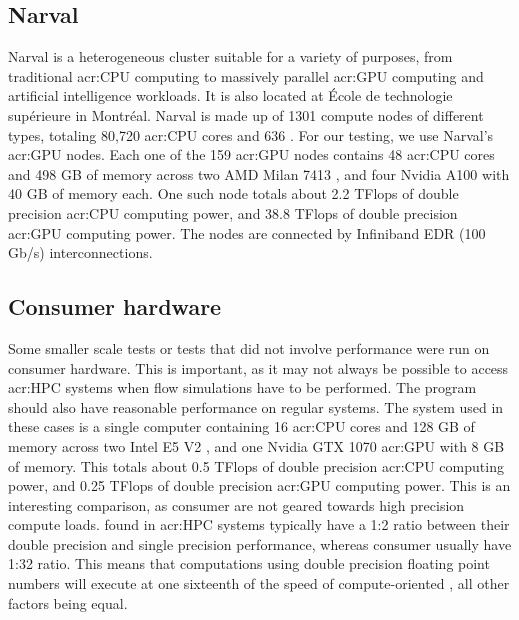 \subsection{Narval}\label{subsection:results:platforms:narval}

Narval is a heterogeneous cluster suitable for a variety of purposes, from traditional
\acrshort{acr:CPU} computing to massively parallel \acrshort{acr:GPU} computing and artificial
intelligence workloads. It is also located at École de technologie supérieure in Montréal. Narval is
made up of 1301 compute nodes of different types, totaling 80,720 \acrshort{acr:CPU} cores and 636
. For our testing, we use Narval's \acrshort{acr:GPU} nodes. Each one of the 159
\acrshort{acr:GPU} nodes contains 48 \acrshort{acr:CPU} cores and 498 GB of memory across two AMD
Milan 7413 , and four Nvidia A100  with 40 GB of memory
each. One such node totals about 2.2 TFlops of double precision \acrshort{acr:CPU} computing power,
and 38.8 TFlops of double precision \acrshort{acr:GPU} computing power. The nodes are connected by
Infiniband EDR (100 Gb/s) interconnections.

\subsection{Consumer hardware}\label{subsection:results:platforms:consumer}

Some smaller scale tests or tests that did not involve performance were run on consumer hardware.
This is important, as it may not always be possible to access \acrshort{acr:HPC} systems when flow
simulations have to be performed. The program should also have reasonable performance on regular
systems. The system used in these cases is a single computer containing 16 \acrshort{acr:CPU} cores
and 128 GB of memory across two Intel E5 V2 , and one Nvidia GTX
1070 \acrshort{acr:GPU} with 8 GB of memory. This totals about 0.5 TFlops of double precision
\acrshort{acr:CPU} computing power, and 0.25 TFlops of double precision \acrshort{acr:GPU} computing
power. This is an interesting comparison, as consumer  are not geared towards
high precision compute loads.  found in \acrshort{acr:HPC} systems typically
have a 1:2 ratio between their double precision and single precision performance, whereas consumer
 usually have 1:32 ratio. This means that computations using double precision
floating point numbers will execute at one sixteenth of the speed of compute-oriented
, all other factors being equal.

